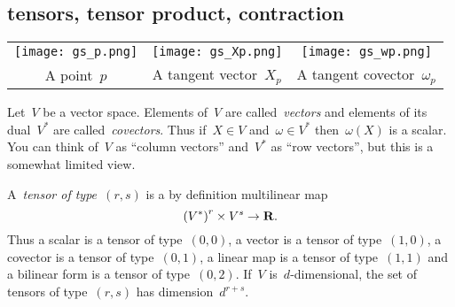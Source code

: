 \subsection{tensors, tensor product, contraction}




\begin{tabular}{ccc}
	\texttt{[image: gs\_p.png]} &
	\texttt{[image: gs\_Xp.png]} &
	\texttt{[image: gs\_wp.png]} \\
	A point~$p$ &
	A tangent vector~$X_p$ &
	A tangent covector~$\omega_p$
\end{tabular}

Let~$V$ be a vector space.  Elements of~$V$ are called~\emph{vectors} and
elements of its dual~$V^*$ are called~\emph{covectors}.
Thus if~$X\in V$ and~$\omega\in V^*$ then~$\omega(X)$ is a scalar.
You can think of~$V$ as ``column vectors'' and~$V^*$ as ``row vectors'', but
this is a somewhat limited view.

A~\emph{tensor of type~$(r,s)$} is a by definition multilinear map
\[
	\left(V^*\right)^r\times V^s\to\mathbf{R}.
\]
Thus a scalar is a tensor of type~$(0,0)$, a vector is a tensor of
type~$(1,0)$, a covector is a tensor of type~$(0,1)$, a linear map is a
tensor of type~$(1,1)$ and a bilinear form is a tensor of type~$(0,2)$.
If~$V$ is~$d$-dimensional, the set of tensors of type~$(r,s)$ has
dimension~$d^{r+s}$.

